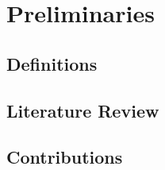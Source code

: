 \chapter{Preliminaries}
\label{chap:Preliminaries}

\section{Definitions}
\label{sec:Definitions}

\section{Literature Review}
\label{sec:Literature Review}

\section{Contributions}
\label{sec:Contributions}


